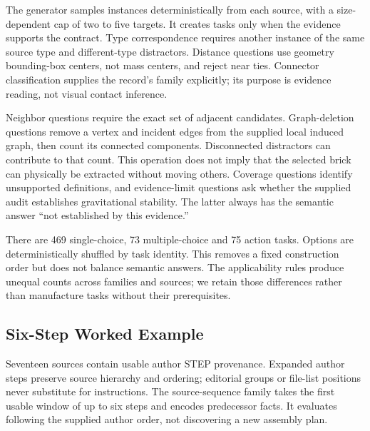 \documentclass[10pt,twocolumn,letterpaper]{article}
\begin{document}
\begin{table}[t]
\centering\small
\caption{Complete task decomposition. Layers: A, atomic; M, metacognitive;
P, procedural; I, integrative. Inputs: V, visual; S, source data;
G, connector graph; E, scene edit. Operations describe the actual task
generator rather than a learned model's hidden reasoning.}
\label{tab:operators}

\end{table}

The generator samples instances deterministically from each source,
with a size-dependent cap of two to five targets. It creates tasks only
when the evidence supports the contract. Type correspondence requires
another instance of the same source type and different-type distractors.
Distance questions use geometry bounding-box centers, not mass centers,
and reject near ties. Connector classification supplies the record's
family explicitly; its purpose is evidence reading, not visual contact
inference.

Neighbor questions require the exact set of adjacent candidates.
Graph-deletion questions remove a vertex and incident edges from the
supplied local induced graph, then count its connected components.
Disconnected distractors can contribute to that count. This operation
does not imply that the selected brick can physically be extracted
without moving others. Coverage questions identify unsupported
definitions, and evidence-limit questions ask whether the supplied
audit establishes gravitational stability. The latter always has the
semantic answer ``not established by this evidence.''

There are 469 single-choice, 73 multiple-choice and 75 action tasks.
Options are deterministically shuffled by task identity. This removes
a fixed construction order but does not balance semantic answers.
The applicability rules produce unequal counts across families and
sources; we retain those differences rather than manufacture tasks
without their prerequisites.

\subsection{Six-Step Worked Example}
Seventeen sources contain usable author STEP provenance. Expanded
author steps preserve source hierarchy and ordering; editorial groups
or file-list positions never substitute for instructions. The
source-sequence family takes the first usable window of up to six
steps and encodes predecessor facts. It evaluates following the
supplied author order, not discovering a new assembly plan.
\end{document}
